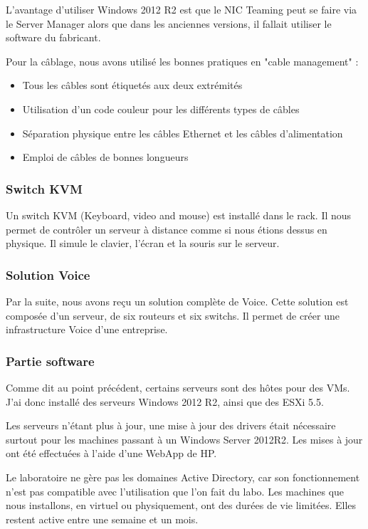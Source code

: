 L'avantage d'utiliser Windows 2012 R2 est que le NIC Teaming peut se faire via le Server Manager alors que dans les anciennes versions, il fallait utiliser le software du fabricant.


Pour la câblage, nous avons utilisé les bonnes pratiques en "cable management" :  
\begin{itemize}
\item Tous les câbles sont étiquetés aux deux extrémités
\item Utilisation d'un code couleur pour les différents types de câbles
\item Séparation physique entre les câbles Ethernet et les câbles d'alimentation
\item Emploi de câbles de bonnes longueurs
\end{itemize}

\subsubsection{Switch KVM}
Un switch KVM (Keyboard, video and mouse) est installé dans le rack.
Il nous permet de contrôler un serveur à distance comme si nous étions dessus en physique.
Il simule le clavier, l'écran et la souris sur le serveur. 

\subsubsection{Solution Voice}
Par la suite, nous avons reçu un solution complète de Voice.
Cette solution est composée d'un serveur, de six routeurs et six switchs.
Il permet de créer une infrastructure Voice d'une entreprise.

\subsubsection{Partie software}
Comme dit au point précédent, certains serveurs sont des hôtes pour des VMs.
J'ai donc installé des serveurs Windows 2012 R2, ainsi que des ESXi 5.5.

Les serveurs n'étant plus à jour, une mise à jour des drivers était nécessaire surtout pour les machines passant à un Windows Server 2012R2.
Les mises à jour ont été effectuées à l'aide d'une WebApp de HP.

Le laboratoire ne gère pas les domaines Active Directory, car son fonctionnement n'est pas compatible avec l'utilisation que l'on fait du labo. 
Les machines que nous installons, en virtuel ou physiquement, ont des durées de vie limitées.
Elles restent active entre une semaine et un mois.

